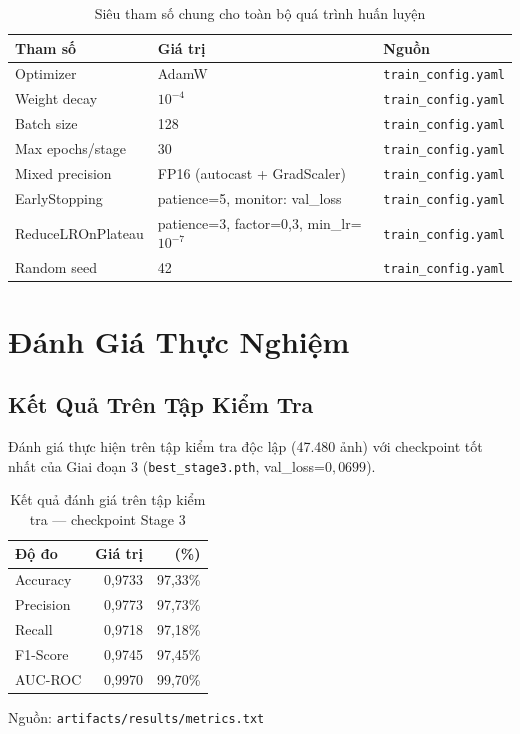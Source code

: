 \begin{table}[H]
  \centering
  \caption{Siêu tham số chung cho toàn bộ quá trình huấn luyện}
  \label{tab:hyperparam}
  \begin{tabular}{lll}
    \toprule
    \textbf{Tham số} & \textbf{Giá trị} & \textbf{Nguồn} \\
    \midrule
    Optimizer          & AdamW \cite{loshchilov2019adamw} & \texttt{train\_config.yaml} \\
    Weight decay       & $10^{-4}$                        & \texttt{train\_config.yaml} \\
    Batch size         & 128                              & \texttt{train\_config.yaml} \\
    Max epochs/stage   & 30                               & \texttt{train\_config.yaml} \\
    Mixed precision    & FP16 (autocast + GradScaler)     & \texttt{train\_config.yaml} \\
    EarlyStopping      & patience=5, monitor: val\_loss   & \texttt{train\_config.yaml} \\
    ReduceLROnPlateau  & patience=3, factor=0,3, min\_lr=$10^{-7}$ & \texttt{train\_config.yaml} \\
    Random seed        & 42                               & \texttt{train\_config.yaml} \\
    \bottomrule
  \end{tabular}
\end{table}

\section{Đánh Giá Thực Nghiệm}

\subsection{Kết Quả Trên Tập Kiểm Tra}

Đánh giá thực hiện trên tập kiểm tra độc lập (47.480 ảnh) với checkpoint tốt nhất của Giai đoạn 3 (\texttt{best\_stage3.pth}, val\_loss=$0{,}0699$).

\begin{table}[H]
  \centering
  \caption{Kết quả đánh giá trên tập kiểm tra --- checkpoint Stage 3}
  \label{tab:test_results}
  \begin{tabular}{lrr}
    \toprule
    \textbf{Độ đo} & \textbf{Giá trị} & \textbf{(\%)} \\
    \midrule
    Accuracy  & 0,9733 & 97,33\% \\
    Precision & 0,9773 & 97,73\% \\
    Recall    & 0,9718 & 97,18\% \\
    F1-Score  & 0,9745 & 97,45\% \\
    AUC-ROC   & 0,9970 & 99,70\% \\
    \bottomrule
  \end{tabular}
  \newline
  {\small Nguồn: \texttt{artifacts/results/metrics.txt}}
\end{table}


